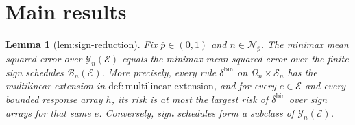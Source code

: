 \documentclass{article}
\newtheorem{lemma}{Lemma}
\begin{document}
\section{Main results}

\begin{lemma}[lem:sign-reduction]\label{lem:sign-reduction}
Fix \(\bar p\in(0,1)\) and \(n\in\mathcal N_{\bar p}\). The minimax mean squared error over \(\mathcal Y_n(\mathcal E)\) equals the minimax mean squared error over the finite sign schedules \(\mathcal B_n(\mathcal E)\). More precisely, every rule \(\delta^{\mathrm{bin}}\) on \(\Omega_n\times\mathcal S_n\) has the multilinear extension in \(\mathrm{def{:}multilinear\text{-}extension}\), and for every \(e\in\mathcal E\) and every bounded response array \(h\), its risk is at most the largest risk of \(\delta^{\mathrm{bin}}\) over sign arrays for that same \(e\). Conversely, sign schedules form a subclass of \(\mathcal Y_n(\mathcal E)\).
\end{lemma}
\end{document}
